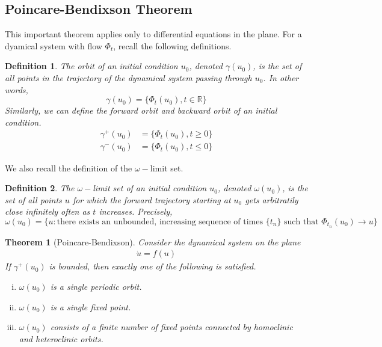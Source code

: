 \documentclass{article}
\newtheorem{theorem}{Theorem}[section]
\newtheorem{definition}{Definition}[section]
\def\R{{\mathbb R}}
\begin{document}
\subsection{Poincare-Bendixson Theorem}

This important theorem applies only to differential equations in the plane. For a dyamical system with flow $\Phi_t$, recall the following definitions.

\begin{definition}The \emph{orbit} of an initial condition $u_0$, denoted $\gamma(u_0)$, is the set of all points in the trajectory of the dynamical system passing through $u_0$. In other words,
\[
\gamma(u_0) = \{ \Phi_t(u_0), t \in \R \}
\]
Similarly, we can define the \emph{forward orbit} and \emph{backward orbit} of an initial condition.
\begin{align*}
\gamma^+(u_0) &= \{ \Phi_t(u_0), t \geq 0 \} \\
\gamma^-(u_0) &= \{ \Phi_t(u_0), t \leq 0 \}
\end{align*}
\end{definition}

We also recall the definition of the $\omega-$limit set.
\begin{definition}The \emph{$\omega-$limit set} of an initial condition $u_0$, denoted $\omega(u_0)$, is the set of all points $u$ for which the forward trajectory starting at $u_0$ gets arbitratily close infinitely often as $t$ increases. Precisely, 
\[
\omega(u_0) = \{ u : \text{there exists an unbounded, increasing sequence of times }\{t_n\} \text{ such that } \Phi_{t_n}(u_0) \rightarrow u \}
\]
\end{definition}

\begin{theorem}[Poincare-Bendixson]
Consider the dynamical system on the plane
\begin{align}\label{planarODE}
\dot{u} = f(u)
\end{align}
If $\gamma^+(u_0)$ is bounded, then exactly one of the following is satisfied.
\begin{enumerate}[(i)]
\item $\omega(u_0)$ is a single periodic orbit.
\item $\omega(u_0)$ is a single fixed point.
\item $\omega(u_0)$ consists of a finite number of fixed points connected by homoclinic and heteroclinic orbits.
\end{enumerate}
\end{theorem}
\end{document}
